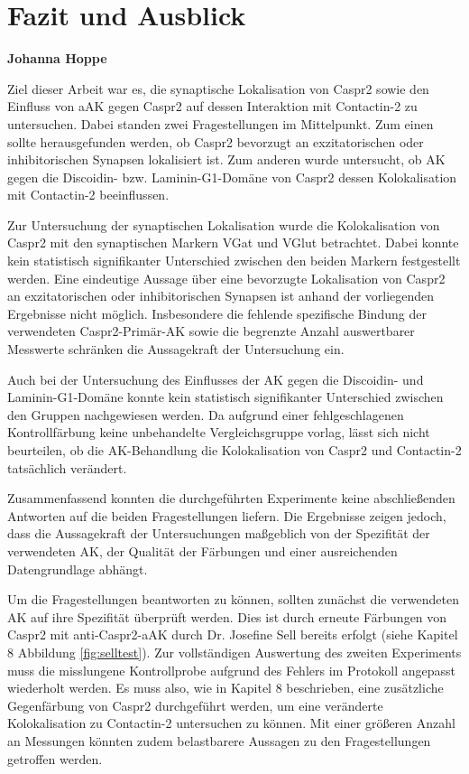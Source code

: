 \chapter{Fazit und Ausblick}
\textbf{Johanna Hoppe}

Ziel dieser Arbeit war es, die synaptische Lokalisation von Caspr2 sowie den Einfluss
von aAK gegen Caspr2 auf dessen Interaktion mit Contactin-2 zu
untersuchen. Dabei standen zwei Fragestellungen im Mittelpunkt. Zum einen sollte
herausgefunden werden, ob Caspr2 bevorzugt an exzitatorischen oder inhibitorischen
Synapsen lokalisiert ist. Zum anderen wurde untersucht, ob AK gegen die
Discoidin- bzw. Laminin-G1-Domäne von Caspr2 dessen Kolokalisation mit
Contactin-2 beeinflussen.

Zur Untersuchung der synaptischen Lokalisation wurde die Kolokalisation von Caspr2
mit den synaptischen Markern VGat und VGlut betrachtet. Dabei konnte kein
statistisch signifikanter Unterschied zwischen den beiden Markern festgestellt werden.
Eine eindeutige Aussage über eine bevorzugte Lokalisation von Caspr2 an
exzitatorischen oder inhibitorischen Synapsen ist anhand der vorliegenden Ergebnisse
nicht möglich. Insbesondere die fehlende spezifische Bindung der verwendeten
Caspr2-Primär-AK sowie die begrenzte Anzahl auswertbarer Messwerte
schränken die Aussagekraft der Untersuchung ein.

Auch bei der Untersuchung des Einflusses der AK gegen die Discoidin- und
Laminin-G1-Domäne konnte kein statistisch signifikanter Unterschied zwischen den
Gruppen nachgewiesen werden. Da aufgrund einer fehlgeschlagenen Kontrollfärbung
keine unbehandelte Vergleichsgruppe vorlag, lässt sich nicht beurteilen, ob die
AK-Behandlung die Kolokalisation von Caspr2 und Contactin-2 tatsächlich
verändert.

Zusammenfassend konnten die durchgeführten Experimente keine abschließenden
Antworten auf die beiden Fragestellungen liefern. Die Ergebnisse zeigen jedoch, dass
die Aussagekraft der Untersuchungen maßgeblich von der Spezifität der verwendeten
AK, der Qualität der Färbungen und einer ausreichenden Datengrundlage
abhängt. 

Um die Fragestellungen beantworten zu können, sollten zunächst die verwendeten
AK auf ihre Spezifität überprüft werden. Dies ist durch erneute Färbungen von Caspr2 mit anti-Caspr2-aAK durch Dr. Josefine Sell bereits erfolgt (siehe Kapitel 8 Abbildung \ref{fig:selltest}).
Zur vollständigen Auswertung des zweiten Experiments muss die misslungene Kontrollprobe aufgrund des Fehlers im Protokoll angepasst wiederholt werden. Es muss also, wie in Kapitel 8 beschrieben, eine zusätzliche Gegenfärbung von Caspr2 durchgeführt werden, um eine veränderte Kolokalisation zu Contactin-2 untersuchen zu können. Mit einer größeren Anzahl an Messungen könnten zudem belastbarere Aussagen zu den Fragestellungen getroffen werden. 
